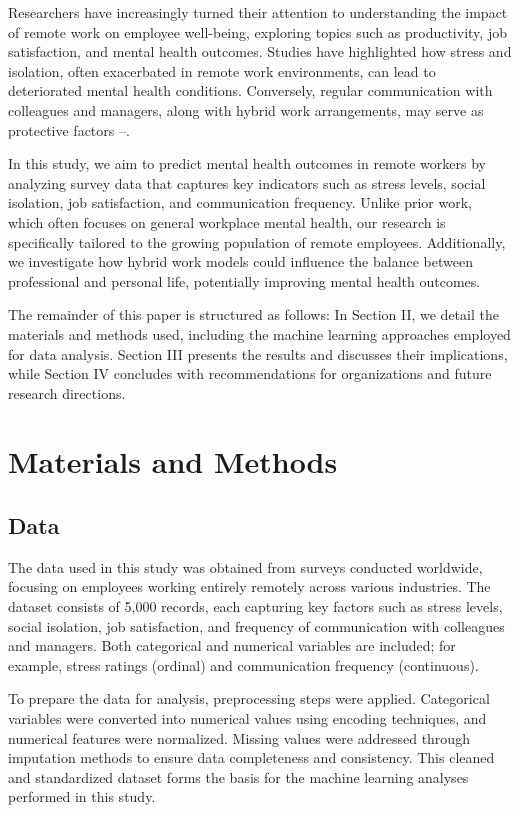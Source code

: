 \documentclass[conference]{IEEEtran}
\begin{document}
Researchers have increasingly turned their attention to understanding the impact of remote work on employee well-being, exploring topics such as productivity, job satisfaction, and mental health outcomes. Studies have highlighted how stress and isolation, often exacerbated in remote work environments, can lead to deteriorated mental health conditions. Conversely, regular communication with colleagues and managers, along with hybrid work arrangements, may serve as protective factors \cite{ref1}–\cite{ref3}. 

In this study, we aim to predict mental health outcomes in remote workers by analyzing survey data that captures key indicators such as stress levels, social isolation, job satisfaction, and communication frequency. Unlike prior work, which often focuses on general workplace mental health, our research is specifically tailored to the growing population of remote employees. Additionally, we investigate how hybrid work models could influence the balance between professional and personal life, potentially improving mental health outcomes.

The remainder of this paper is structured as follows: In Section II, we detail the materials and methods used, including the machine learning approaches employed for data analysis. Section III presents the results and discusses their implications, while Section IV concludes with recommendations for organizations and future research directions.


\hfill 
 

\section{Materials and Methods}
\subsection{Data}
The data used in this study was obtained from surveys conducted worldwide, focusing on employees working entirely remotely across various industries. The dataset consists of 5,000 records, each capturing key factors such as stress levels, social isolation, job satisfaction, and frequency of communication with colleagues and managers. Both categorical and numerical variables are included; for example, stress ratings (ordinal) and communication frequency (continuous).

To prepare the data for analysis, preprocessing steps were applied. Categorical variables were converted into numerical values using encoding techniques, and numerical features were normalized. Missing values were addressed through imputation methods to ensure data completeness and consistency. This cleaned and standardized dataset forms the basis for the machine learning analyses performed in this study.
\end{document}
